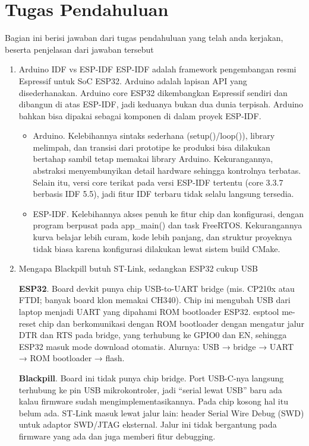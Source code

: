 \section{Tugas Pendahuluan}
Bagian ini berisi jawaban dari tugas pendahuluan yang telah anda kerjakan, beserta penjelasan dari jawaban tersebut
\begin{enumerate}
	\item Arduino IDF vs ESP-IDF
    ESP-IDF adalah framework pengembangan resmi Espressif untuk SoC ESP32. Arduino adalah lapisan API yang disederhanakan. Arduino core ESP32 dikembangkan Espressif sendiri dan dibangun di atas ESP-IDF, jadi keduanya bukan dua dunia terpisah. Arduino bahkan bisa dipakai sebagai komponen di dalam proyek ESP-IDF.
    \begin{itemize}
        \item Arduino. Kelebihannya sintaks sederhana (setup()/loop()), library melimpah, dan transisi dari prototipe ke produksi bisa dilakukan bertahap sambil tetap memakai library Arduino. Kekurangannya, abstraksi menyembunyikan detail hardware sehingga kontrolnya terbatas. Selain itu, versi core terikat pada versi ESP-IDF tertentu (core 3.3.7 berbasis IDF 5.5), jadi fitur IDF terbaru tidak selalu langsung tersedia. 
        \item ESP-IDF. Kelebihannya akses penuh ke fitur chip dan konfigurasi, dengan program berpusat pada app\_main() dan task FreeRTOS. Kekurangannya kurva belajar lebih curam, kode lebih panjang, dan struktur proyeknya tidak biasa karena konfigurasi dilakukan lewat sistem build CMake.
    \end{itemize}
	\item Mengapa Blackpill butuh ST-Link, sedangkan ESP32 cukup USB
    
    \textbf{ESP32}. Board devkit punya chip USB-to-UART bridge (mis. CP210x atau FTDI; banyak board klon memakai CH340). Chip ini mengubah USB dari laptop menjadi UART yang dipahami ROM bootloader ESP32. esptool me-reset chip dan berkomunikasi dengan ROM bootloader dengan mengatur jalur DTR dan RTS pada bridge, yang terhubung ke GPIO0 dan EN, sehingga ESP32 masuk mode download otomatis. Alurnya: USB → bridge → UART → ROM bootloader → flash.

    \textbf{Blackpill}. Board ini tidak punya chip bridge. Port USB-C-nya langsung terhubung ke pin USB mikrokontroler, jadi “serial lewat USB” baru ada kalau firmware sudah mengimplementasikannya. Pada chip kosong hal itu belum ada. ST-Link masuk lewat jalur lain: header Serial Wire Debug (SWD) untuk adaptor SWD/JTAG eksternal. Jalur ini tidak bergantung pada firmware yang ada dan juga memberi fitur debugging.
    

\end{enumerate}
